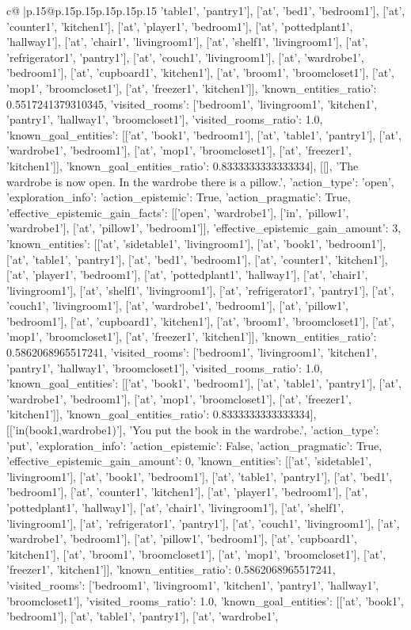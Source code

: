 \documentclass{article}
\begin{document}
{\begin{supertabular}{c@{$\;$}|p{.15\linewidth}@{}p{.15\linewidth}p{.15\linewidth}p{.15\linewidth}p{.15\linewidth}p{.15\linewidth}}
{{{'table1', 'pantry1'], ['at', 'bed1', 'bedroom1'], ['at', 'counter1', 'kitchen1'], ['at', 'player1', 'bedroom1'], ['at', 'pottedplant1', 'hallway1'], ['at', 'chair1', 'livingroom1'], ['at', 'shelf1', 'livingroom1'], ['at', 'refrigerator1', 'pantry1'], ['at', 'couch1', 'livingroom1'], ['at', 'wardrobe1', 'bedroom1'], ['at', 'cupboard1', 'kitchen1'], ['at', 'broom1', 'broomcloset1'], ['at', 'mop1', 'broomcloset1'], ['at', 'freezer1', 'kitchen1']], 'known_entities_ratio': 0.5517241379310345, 'visited_rooms': ['bedroom1', 'livingroom1', 'kitchen1', 'pantry1', 'hallway1', 'broomcloset1'], 'visited_rooms_ratio': 1.0, 'known_goal_entities': [['at', 'book1', 'bedroom1'], ['at', 'table1', 'pantry1'], ['at', 'wardrobe1', 'bedroom1'], ['at', 'mop1', 'broomcloset1'], ['at', 'freezer1', 'kitchen1']], 'known_goal_entities_ratio': 0.8333333333333334}}], [[], 'The wardrobe is now open. In the wardrobe there is a pillow.', {'action_type': 'open', 'exploration_info': {'action_epistemic': True, 'action_pragmatic': True, 'effective_epistemic_gain_facts': [['open', 'wardrobe1'], ['in', 'pillow1', 'wardrobe1'], ['at', 'pillow1', 'bedroom1']], 'effective_epistemic_gain_amount': 3, 'known_entities': [['at', 'sidetable1', 'livingroom1'], ['at', 'book1', 'bedroom1'], ['at', 'table1', 'pantry1'], ['at', 'bed1', 'bedroom1'], ['at', 'counter1', 'kitchen1'], ['at', 'player1', 'bedroom1'], ['at', 'pottedplant1', 'hallway1'], ['at', 'chair1', 'livingroom1'], ['at', 'shelf1', 'livingroom1'], ['at', 'refrigerator1', 'pantry1'], ['at', 'couch1', 'livingroom1'], ['at', 'wardrobe1', 'bedroom1'], ['at', 'pillow1', 'bedroom1'], ['at', 'cupboard1', 'kitchen1'], ['at', 'broom1', 'broomcloset1'], ['at', 'mop1', 'broomcloset1'], ['at', 'freezer1', 'kitchen1']], 'known_entities_ratio': 0.5862068965517241, 'visited_rooms': ['bedroom1', 'livingroom1', 'kitchen1', 'pantry1', 'hallway1', 'broomcloset1'], 'visited_rooms_ratio': 1.0, 'known_goal_entities': [['at', 'book1', 'bedroom1'], ['at', 'table1', 'pantry1'], ['at', 'wardrobe1', 'bedroom1'], ['at', 'mop1', 'broomcloset1'], ['at', 'freezer1', 'kitchen1']], 'known_goal_entities_ratio': 0.8333333333333334}}], [['in(book1,wardrobe1)'], 'You put the book in the wardrobe.', {'action_type': 'put', 'exploration_info': {'action_epistemic': False, 'action_pragmatic': True, 'effective_epistemic_gain_amount': 0, 'known_entities': [['at', 'sidetable1', 'livingroom1'], ['at', 'book1', 'bedroom1'], ['at', 'table1', 'pantry1'], ['at', 'bed1', 'bedroom1'], ['at', 'counter1', 'kitchen1'], ['at', 'player1', 'bedroom1'], ['at', 'pottedplant1', 'hallway1'], ['at', 'chair1', 'livingroom1'], ['at', 'shelf1', 'livingroom1'], ['at', 'refrigerator1', 'pantry1'], ['at', 'couch1', 'livingroom1'], ['at', 'wardrobe1', 'bedroom1'], ['at', 'pillow1', 'bedroom1'], ['at', 'cupboard1', 'kitchen1'], ['at', 'broom1', 'broomcloset1'], ['at', 'mop1', 'broomcloset1'], ['at', 'freezer1', 'kitchen1']], 'known_entities_ratio': 0.5862068965517241, 'visited_rooms': ['bedroom1', 'livingroom1', 'kitchen1', 'pantry1', 'hallway1', 'broomcloset1'], 'visited_rooms_ratio': 1.0, 'known_goal_entities': [['at', 'book1', 'bedroom1'], ['at', 'table1', 'pantry1'], ['at', 'wardrobe1', }}}
\end{supertabular}}
\end{document}
